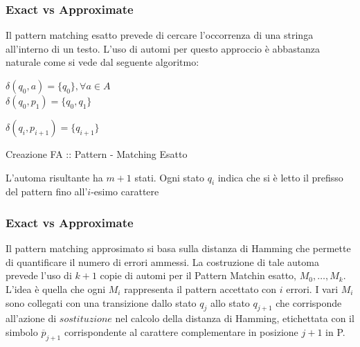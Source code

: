 \documentclass{beamer}
\begin{document}
\begin{frame}
\frametitle{Exact vs Approximate}
Il pattern matching esatto prevede di cercare l'occorrenza di una stringa all'interno di un testo.
L'uso di automi per questo approccio è abbastanza naturale come si vede dal seguente algoritmo:\\
\begin{algorithm}[H]
\begin{algorithmic}[1]

\STATE $\delta(q_0,a) = \{q_0\} , \forall a \in A$\\

\STATE $\delta(q_0,p_1) = \{q_0,q_1\}$\\


\STATE $\delta(q_i,p_{i+1}) = \{q_{i+1}\}$

\ENDFOR
\end{algorithmic}
\caption{Creazione FA :: Pattern - Matching Esatto}
\end{algorithm}

L'automa risultante ha $m+1$ stati. Ogni stato $q_i$ indica che si è letto il prefisso del pattern fino all'$i$-esimo carattere

\end{frame}

\begin{frame}
\frametitle{Exact vs Approximate}

Il pattern matching approsimato si basa sulla distanza di Hamming che permette di quantificare il numero di errori ammessi.
La costruzione di tale automa prevede l'uso di $k+1$ copie di automi per il Pattern Matchin esatto, $M_0,\dots ,M_k$. \\
L'idea è quella che ogni $M_i$ rappresenta il pattern accettato con $i$ errori.
I vari $M_i$ sono collegati con una transizione dallo stato $q_j$ allo stato $q_{j+1}$ che corrisponde all'azione di $sostituzione$ nel calcolo della distanza di Hamming, etichettata con il simbolo $\overline{p}_{j+1}$ corrispondente al carattere complementare in posizione $j+1$ in P.\\

\end{frame}
\end{document}
